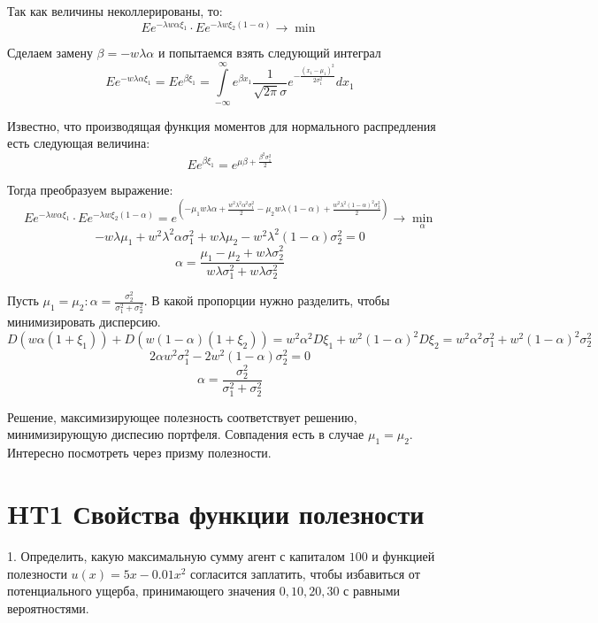 \documentclass[%
12pt, %
final, %
oneside, %
onecolumn, %
centertags]{article} %
\theoremstyle{plain}
\theoremstyle{definition}
\theoremstyle{remark}
\begin{document}
Так как величины неколлерированы, то:
$$Ee^{-\lambda w \alpha \xi_1} \cdot Ee^{-\lambda w \xi_2 (1-\alpha)} \to \min$$

Сделаем замену $\beta = -w\lambda\alpha$ и попытаемся взять следующий интеграл
$$Ee^{-w\lambda\alpha\xi_1} = Ee^{\beta \xi_1} = \int\limits_{-\infty}^{\infty} e^{\beta x_1}\frac{1}{\sqrt{2\pi}\sigma}e^{-\frac{(x_1-\mu_1)^2}{2\sigma_1^2}}dx_1$$

Известно, что производящая функция моментов для нормального распредления есть следующая величина:
$$Ee^{\beta \xi_1} = e^{\mu\beta + \frac{\beta^2 \sigma_1^2}{2}}$$

Тогда преобразуем выражение:
$$Ee^{-\lambda w \alpha \xi_1} \cdot Ee^{-\lambda w \xi_2 (1-\alpha)} = e^{\left(-\mu_1w\lambda\alpha + \frac{w^2 \lambda^2\alpha^2 \sigma_1^2}{2}-\mu_2w\lambda(1-\alpha) + \frac{w^2 \lambda^2(1-\alpha)^2 \sigma_2^2}{2}\right)} \to \underset{\alpha}{\min}$$
$$-w\lambda\mu_1 + w^2\lambda^2\alpha\sigma_1^2 + w\lambda\mu_2-w^2\lambda^2(1-\alpha)\sigma_2^2 = 0$$
$$\alpha = \frac{\mu_1-\mu_2+w\lambda\sigma_2^2}{w\lambda\sigma_1^2+w\lambda\sigma_2^2}$$

Пусть $\mu_1=\mu_2: \alpha = \frac{\sigma_2^2}{\sigma_1^2+\sigma_2^2}$. В какой пропорции нужно разделить, чтобы минимизировать дисперсию.
$$D(w\alpha(1+\xi_1))+D(w(1-\alpha)(1+\xi_2)) = w^2 \alpha^2 D\xi_1 + w^2 (1-\alpha)^2 D\xi_2 = w^2\alpha^2\sigma_1^2 + w^2(1-\alpha)^2\sigma_2^2$$
$$2\alpha w^2\sigma_1^2 -2w^2(1-\alpha)\sigma_2^2 = 0$$
$$\alpha = \frac{\sigma_2^2}{\sigma_1^2+\sigma_2^2}$$

Решение, максимизирующее полезность соответствует решению, минимизирующую диспесию портфеля. Совпадения есть в случае $\mu_1 = \mu_2$. Интересно посмотреть через призму полезности.

\newpage
\section{HT1 Свойства функции полезности}

1. Определить, какую максимальную сумму агент с капиталом $100$ и функцией полезности $u(x) = 5x - 0.01x^2$ согласится заплатить, чтобы избавиться от потенциального ущерба, принимающего значения $0,10,20,30$ с равными вероятностями.
\end{document}
